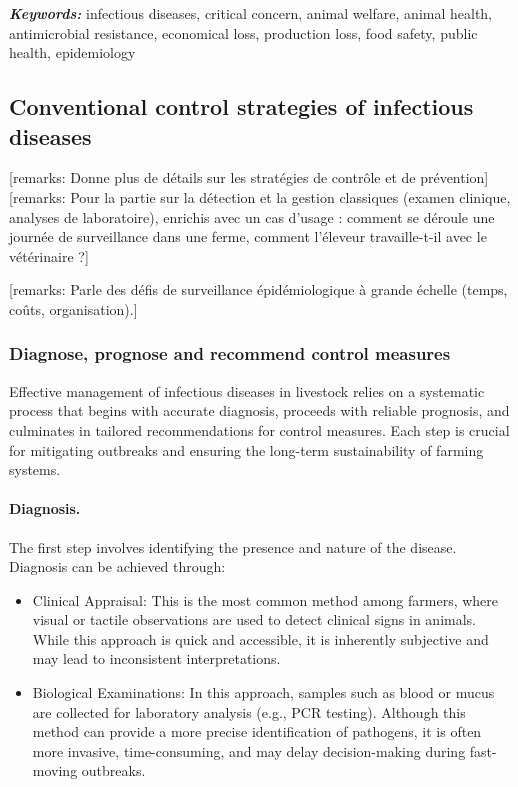 \textit{\textbf{Keywords:}} infectious diseases, critical concern, animal welfare, animal health, antimicrobial resistance, economical loss, production loss, food safety, public health, epidemiology


\subsection{Conventional control strategies of infectious diseases}
\label{Conventional control strategies} %


[remarks: Donne plus de détails sur les stratégies de contrôle et de prévention]
[remarks: Pour la partie sur la détection et la gestion classiques (examen clinique, analyses de laboratoire), enrichis avec un cas d’usage : comment se déroule une journée de surveillance dans une ferme, comment l’éleveur travaille-t-il avec le vétérinaire ?]

[remarks: Parle des défis de surveillance épidémiologique à grande échelle (temps, coûts, organisation).]

\subsubsection{Diagnose, prognose and recommend control measures}

Effective management of infectious diseases in livestock relies on a systematic process that begins with accurate diagnosis, proceeds with reliable prognosis, and culminates in tailored recommendations for control measures. Each step is crucial for mitigating outbreaks and ensuring the long-term sustainability of farming systems.

\paragraph{Diagnosis.} The first step involves identifying the presence and nature of the disease. Diagnosis can be achieved through:
\begin{itemize}
    \item Clinical Appraisal: This is the most common method among farmers, where visual or tactile observations are used to detect clinical signs in animals. While this approach is quick and accessible, it is inherently subjective and may lead to inconsistent interpretations.
    \item Biological Examinations: In this approach, samples such as blood or mucus are collected for laboratory analysis (e.g., PCR testing). Although this method can provide a more precise identification of pathogens, it is often more invasive, time-consuming, and may delay decision-making during fast-moving outbreaks.
\end{itemize}

